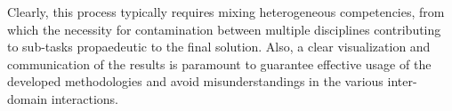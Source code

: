 Clearly, this process typically requires mixing heterogeneous competencies, from which the necessity for contamination between multiple disciplines contributing to sub-tasks propaedeutic to the final solution.
Also, a clear visualization and communication of the results is paramount to guarantee effective usage of the developed methodologies and avoid misunderstandings in the various inter-domain interactions.




